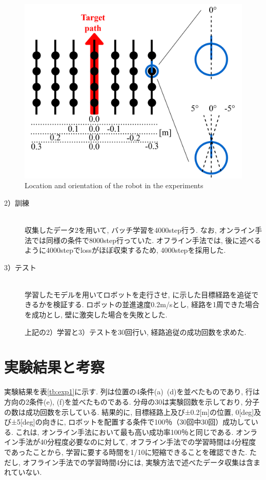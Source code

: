 \begin{figure}[h]
  \centering
  \includegraphics[keepaspectratio, scale=0.6]{images/collect2.png}
  \caption{Location and orientation of the robot in the experiments}
  \label{Fig:old-method}
  \end{figure}

\begin{description}
  \item[2）訓練]\mbox{}\\収集したデータ2を用いて, バッチ学習を4000step行う. なお, オンライン手法では同様の条件で8000step行っていた. オフライン手法では, 後に述べるように4000stepでlossがほぼ収束するため, 4000stepを採用した.
\end{description}

\begin{description}
  \item[3）テスト]\mbox{}\\ 学習したモデルを用いてロボットを走行させ, に示した目標経路を追従できるかを検証する. ロボットの並進速度0.2m/sとし, 経路を1周できた場合を成功とし, 壁に激突した場合を失敗とした.
  \par 上記の2）学習と3）テストを30回行い, 経路追従の成功回数を求めた. 
\end{description}

\section{実験結果と考察}
実験結果を表\ref{tb:exp1}に示す. 列は位置の4条件(a)~(d)を並べたものであり, 行は方向の2条件(e), (f)を並べたものである. 分母の30は実験回数を示しており, 分子の数は成功回数を示している. 結果的に, 目標経路上及び±0.2[m]の位置, 0[deg]及び±5[deg]の向きに, ロボットを配置する条件で100％（30回中30回）成功している. これは, オンライン手法において最も高い成功率100％\cite{okada-si2021}と同じである. オンライン手法が40分程度必要なのに対して, オフライン手法での学習時間は4分程度であったことから, 学習に要する時間を1/10に短縮できることを確認できた. ただし, オフライン手法での学習時間4分には, 実験方法で述べたデータ収集は含まれていない. 

